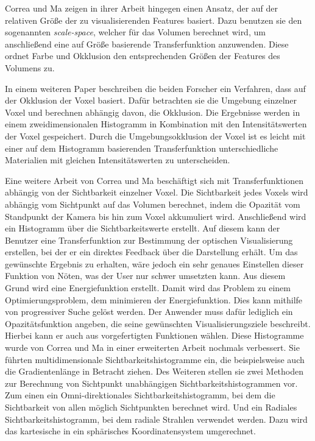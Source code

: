 Correa und Ma zeigen in ihrer Arbeit \cite{correa2008size} hingegen einen Ansatz, der auf der relativen Größe der zu visualisierenden Features basiert.
\newline
Dazu benutzen sie den sogenannten \textit{scale-space}, welcher für das Volumen berechnet wird, um anschließend eine auf Größe basierende Transferfunktion anzuwenden. Diese ordnet Farbe und Okklusion den entsprechenden Größen der Features des Volumens zu.


In einem weiteren Paper \cite{correa2009occlusion} beschreiben die beiden Forscher ein Verfahren, dass auf der Okklusion der Voxel basiert.
\newline
Dafür betrachten sie die Umgebung einzelner Voxel und berechnen abhängig davon, die Okklusion. Die Ergebnisse werden in einem zweidimensionalen Histogramm in Kombination mit den Intensitätswerten der Voxel gespeichert.
\newline
Durch die Umgebungsokklusion der Voxel ist es leicht mit einer auf dem Histogramm basierenden Transferfunktion unterschiedliche Materialien mit gleichen Intensitätswerten zu unterscheiden.


Eine weitere Arbeit \cite{correa2009visibility} von Correa und Ma beschäftigt sich mit Transferfunktionen abhängig von der Sichtbarkeit einzelner Voxel.
\newline
Die Sichtbarkeit jedes Voxels wird abhängig vom Sichtpunkt auf das Volumen berechnet, indem die Opazität vom Standpunkt der Kamera bis hin zum Voxel akkumuliert wird. Anschließend wird ein Histogramm über die Sichtbarkeitswerte erstellt.
\newline
Auf diesem kann der Benutzer eine Transferfunktion zur Bestimmung der optischen Visualisierung erstellen, bei der er ein direktes Feedback über die Darstellung erhält.
\newline
Um das gewünschte Ergebnis zu erhalten, wäre jedoch ein sehr genaues Einstellen dieser Funktion von Nöten, was der User nur schwer umsetzten kann.
\newline
Aus diesem Grund wird eine Energiefunktion erstellt. Damit wird das Problem zu einem Optimierungsproblem, dem minimieren der Energiefunktion. Dies kann mithilfe von progressiver Suche gelöst werden. 
\newline
Der Anwender muss dafür lediglich ein Opazitätsfunktion angeben, die seine gewünschten Visualisierungsziele beschreibt. Hierbei kann er auch aus vorgefertigten Funktionen wählen.
\newline
Diese Histogramme wurde von Correa und Ma in einer erweiterten Arbeit \cite{correa2011visibility} nochmals verbessert. Sie führten multidimensionale Sichtbarkeitshistogramme ein, die beispielsweise auch die Gradientenlänge in Betracht ziehen.
\newline
Des Weiteren stellen sie zwei Methoden zur Berechnung von Sichtpunkt unabhängigen Sichtbarkeitshistogrammen vor. Zum einen ein Omni-direktionales Sichtbarkeitshistogramm, bei dem die Sichtbarkeit von allen möglich Sichtpunkten berechnet wird. Und ein Radiales Sichtbarkeitshistogramm, bei dem radiale Strahlen verwendet werden. Dazu wird das kartesische in ein sphärisches Koordinatensystem umgerechnet.



